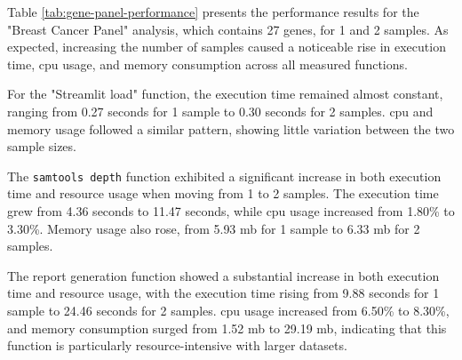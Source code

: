 Table \ref{tab:gene-panel-performance} presents the performance results for the "Breast Cancer Panel" analysis, which contains 27 genes, for 1 and 2 samples. As expected, increasing the number of samples caused a noticeable rise in execution time, \ac{cpu} usage, and memory consumption across all measured functions.

For the "Streamlit load" function, the execution time remained almost constant, ranging from 0.27 seconds for 1 sample to 0.30 seconds for 2 samples. \ac{cpu} and memory usage followed a similar pattern, showing little variation between the two sample sizes.

The \texttt{samtools depth} function exhibited a significant increase in both execution time and resource usage when moving from 1 to 2 samples. The execution time grew from 4.36 seconds to 11.47 seconds, while \ac{cpu} usage increased from 1.80\% to 3.30\%. Memory usage also rose, from 5.93 \ac{mb} for 1 sample to 6.33 \ac{mb} for 2 samples.

The report generation function showed a substantial increase in both execution time and resource usage, with the execution time rising from 9.88 seconds for 1 sample to 24.46 seconds for 2 samples. \ac{cpu} usage increased from 6.50\% to 8.30\%, and memory consumption surged from 1.52 \ac{mb} to 29.19 \ac{mb}, indicating that this function is particularly resource-intensive with larger datasets.

\begin{table}[htbp] 
    \centering 
    \caption{Performance of Gene Panel Analysis (Breast Cancer Panel) for 1 and 2 Samples}
    \label{tab:gene-panel-performance}
\end{table}

